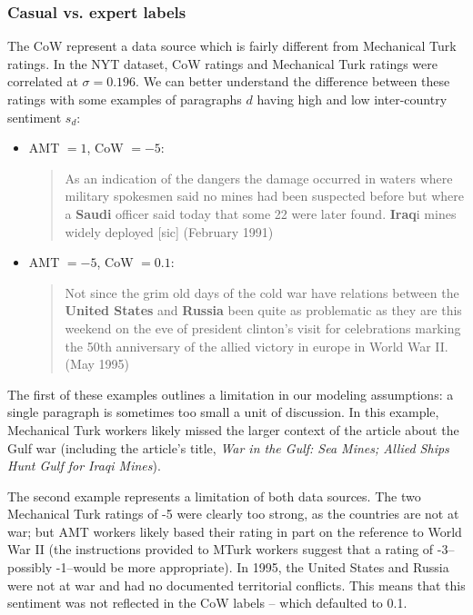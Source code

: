 \subsubsection{Casual vs. expert labels}
The CoW represent a data source which is fairly different from
Mechanical Turk ratings. In the NYT dataset, CoW ratings and
Mechanical Turk ratings were correlated at $\sigma=0.196$.  We can
better understand the difference between these ratings with some
examples of paragraphs $d$ having high and low inter-country sentiment
$s_d$:
\begin{itemize}
  \item AMT $= 1$, CoW $=-5$: \begin{quote}As an
    indication of the dangers the damage occurred in waters where
    military spokesmen said no mines had been suspected before but
    where a \textbf{Saudi} officer said today that some 22 were later
    found. \textbf{Iraq}i mines widely deployed [sic] (February 1991)
    \cite{cushman:1991}
\end{quote}
  \item AMT $ = -5$, CoW $=0.1$: \begin{quote}Not since
    the grim old days of the cold war have relations between the
    \textbf{United States} and \textbf{Russia} been quite as problematic as they
    are this weekend on the eve of president clinton's visit for
    celebrations marking the 50th anniversary of the allied victory in
    europe in World War II. (May 1995) \cite{apple:1995}
\end{quote}
\end{itemize}

The first of these examples outlines a limitation in our modeling
assumptions: a single paragraph is sometimes too small a unit of
discussion.  In this example, Mechanical Turk workers likely missed
the larger context of the article about the Gulf war (including the
article's title, \emph{War in the Gulf: Sea Mines; Allied Ships Hunt
  Gulf for Iraqi Mines}).

The second example represents a limitation of both data sources.  The
two Mechanical Turk ratings of -5 were clearly too strong, as the
countries are not at war; but AMT workers likely based their rating in
part on the reference to World War II (the instructions provided to
MTurk workers suggest that a rating of -3--possibly -1--would be more
appropriate).  In 1995, the United States and Russia were not at war
and had no documented territorial conflicts.  This means that this
sentiment was not reflected in the CoW labels -- which defaulted to
0.1.

